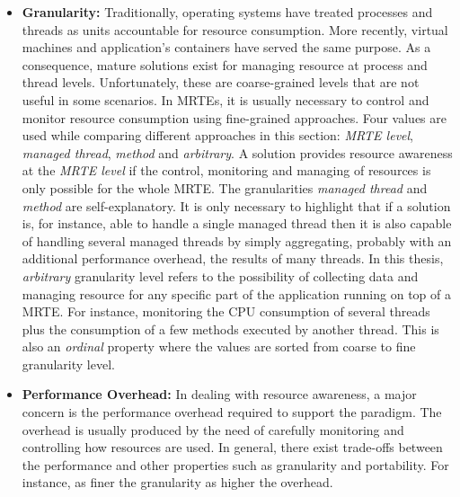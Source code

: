 \begin{itemize}
\item \textbf{Granularity:}
Traditionally, operating systems have treated processes and threads as units accountable for resource consumption.
More recently, virtual machines and application's containers have served the same purpose.
As a consequence, mature solutions exist for managing resource at process and thread levels.
Unfortunately, these are coarse-grained levels that are not useful in some scenarios.
In MRTEs, it is usually necessary to control and monitor resource consumption using fine-grained approaches.
Four values are used while comparing different approaches in this section: \textit{MRTE level}, \textit{managed thread}, \textit{method} and \textit{arbitrary}.
A solution provides resource awareness at the \textit{MRTE level} if the control, monitoring and managing of resources is only possible for the whole MRTE.
The granularities \textit{managed thread} and \textit{method} are self-explanatory.
It is only necessary to highlight that if a solution is, for instance, able to handle a single managed thread then it is also capable of handling several managed threads by simply aggregating, probably with an additional performance overhead, the results of many threads.
In this thesis, \textit{arbitrary} granularity level refers to the possibility of collecting data and managing resource for any specific part of the application running on top of a MRTE.
For instance, monitoring the CPU consumption of several threads plus the consumption of a few methods executed by another thread.
This is also an \textit{ordinal} property where the values are sorted from coarse to fine granularity level.

\item \textbf{Performance Overhead:} 
In dealing with resource awareness, a major concern is the performance overhead required to support the paradigm.
The overhead is usually produced by the need of carefully monitoring and controlling how resources are used.
In general, there exist trade-offs between the performance and other properties such as granularity and portability.
For instance, as finer the granularity as higher the overhead.


\end{itemize}
